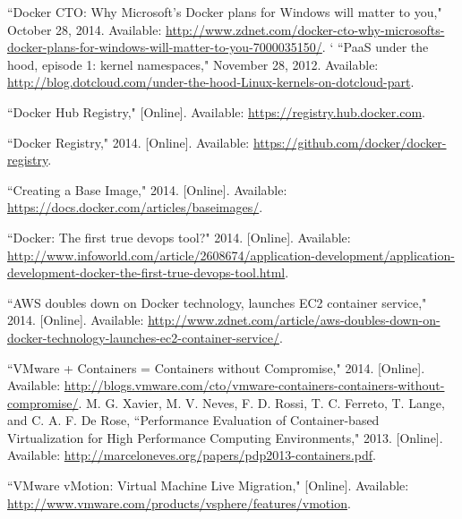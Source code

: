 
\begin{thebibliography}{99}
\begin{singlespace}
\raggedright

``Docker CTO: Why Microsoft's Docker plans for Windows will matter to you," October 28, 2014. Available: \url{http://www.zdnet.com/docker-cto-why-microsofts-docker-plans-for-windows-will-matter-to-you-7000035150/}.
`
``PaaS under the hood, episode 1: kernel namespaces," November 28, 2012. Available: \url{http://blog.dotcloud.com/under-the-hood-Linux-kernels-on-dotcloud-part}.

``Docker Hub Registry," [Online]. Available: \url{https://registry.hub.docker.com}.

``Docker Registry," 2014. [Online]. Available: \url{https://github.com/docker/docker-registry}.

``Creating a Base Image," 2014. [Online]. Available: \url{https://docs.docker.com/articles/baseimages/}.


``Docker: The first true devops tool?" 2014. [Online]. Available: \url{http://www.infoworld.com/article/2608674/application-development/application-development-docker-the-first-true-devops-tool.html}.



``AWS doubles down on Docker technology, launches EC2 container service," 2014. [Online]. Available: \url{http://www.zdnet.com/article/aws-doubles-down-on-docker-technology-launches-ec2-container-service/}.

``VMware + Containers = Containers without Compromise," 2014. [Online]. Available: \url{http://blogs.vmware.com/cto/vmware-containers-containers-without-compromise/}.
M. G. Xavier, M. V. Neves, F. D. Rossi, T. C. Ferreto, T. Lange, and C. A. F. De Rose, ``Performance Evaluation of Container-based Virtualization for High Performance Computing Environments," 2013. [Online]. Available: \url{http://marceloneves.org/papers/pdp2013-containers.pdf}.

``VMware vMotion: Virtual Machine Live Migration," [Online]. Available: \url{http://www.vmware.com/products/vsphere/features/vmotion}.


\end{singlespace}
\end{thebibliography}
